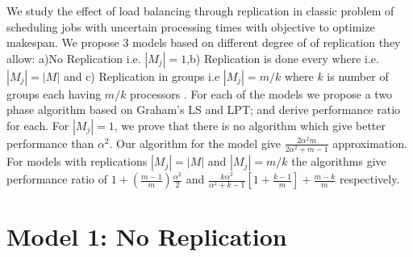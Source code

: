 \documentclass[10pt, conference, compsocconf]{IEEEtran}
\begin{document}
We study the effect of load balancing through replication in classic
problem of scheduling jobs with uncertain processing times with
objective to optimize makespan. We propose 3 models based on different
degree of of replication they allow: a)No Replication i.e. $|M_j|=1
$,b) Replication is done every where i.e.$|M_j|=|M|$ and c)
Replication in groups i.e $|M_j|= m/k$ where $k$ is number of groups
each having $m/k$ processors . For each of the models we propose a two
phase algorithm based on Graham's LS and LPT; and derive performance
ratio for each. For $|M_j|=1 $, we prove that there is no algorithm
which give better performance than $\alpha^2$. Our algorithm for the
model give $\frac{2\alpha^{2}m}{2\alpha^{2}+ m-1}$ approximation. For
models with replications $|M_j|=|M|$ and $|M_j|= m/k$ the algorithms
give performance ratio of $ 1 + (\frac{m-1}{m})\frac{\alpha^{2}}{2}$
and $\frac{k\alpha^{2}}{\alpha^{2}+k-1}\left[1+ {\frac{k-1}{m}}
\right]+ {\frac{m-k}{m}}$ respectively.

\section{Model 1: No Replication}\label{sec4} 
\end{document}
